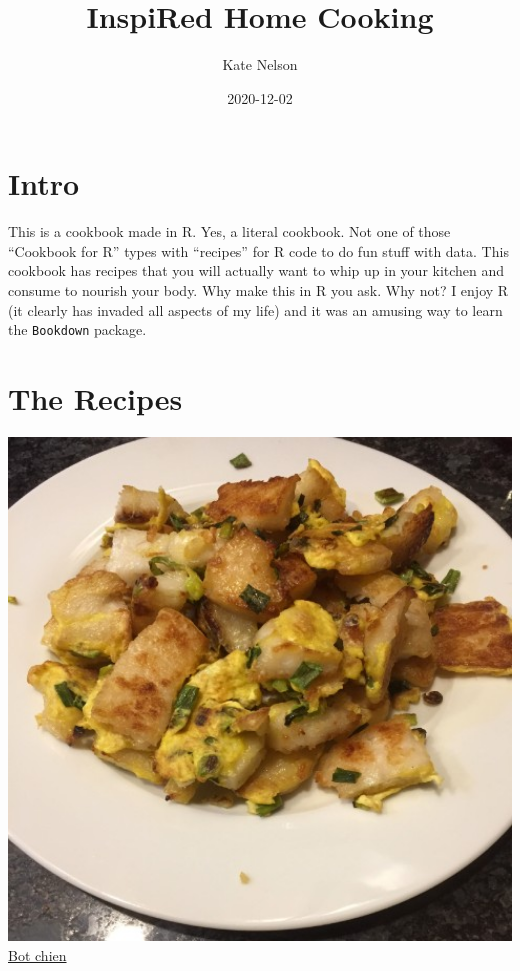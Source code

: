 \documentclass[
]{book}
\title{InspiRed Home Cooking}
\author{Kate Nelson}
\date{2020-12-02}
\begin{document}
\maketitle

{
\setcounter{tocdepth}{1}
\tableofcontents
}
\hypertarget{intro}{%
\chapter*{Intro}\label{intro}}

This is a cookbook made in R. Yes, a literal cookbook. Not one of those ``Cookbook for R'' types with ``recipes'' for R code to do fun stuff with data. This cookbook has recipes that you will actually want to whip up in your kitchen and consume to nourish your body. Why make this in R you ask. Why not? I enjoy R (it clearly has invaded all aspects of my life) and it was an amusing way to learn the \texttt{Bookdown} package.

\hypertarget{the-recipes}{%
\chapter*{The Recipes}\label{the-recipes}}

\protect\hyperlink{botchien}{\includegraphics[width=1\textwidth,height=\textheight]{bot_chien_small.jpg}}
\protect\hyperlink{botchien}{Bot chien}
\end{document}
